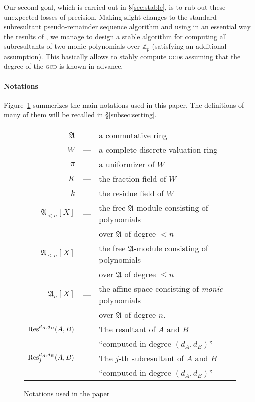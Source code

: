 \documentclass{jT}
\numberwithin{equation}{section}
\theoremstyle{definition}
\newcommand{\Z}{\mathbb Z}
\newcommand{\Zp}{\Z_p}
\newcommand{\ring}{\mathfrak A}
\renewcommand{\Res}{\text{\rm Res}}
\newcommand{\A}{W}
\begin{document}
Our second goal, which is carried out in \S \ref{sec:stable}, is to rub 
out these unexpected losses of precision. Making slight changes to the 
standard subresultant pseudo-remainder sequence algorithm and using in 
an essential way the results of \cite{padicprec}, we manage to design a stable 
algorithm for computing all subresultants of two monic polynomials over 
$\Zp$ (satisfying an additional assumption). This basically allows 
to stably compute \textsc{gcd}s assuming that the degree of the 
\textsc{gcd} is known in advance.

\paragraph{Notations}

Figure~\ref{fig:notations} summerizes the main notations used in
this paper. The definitions of many of them will be recalled in 
\S \ref{subsec:setting}.

\begin{figure}
\begin{center}
\begin{tabular}{rcl}
$\ring$ &--- & a commutative ring \\
$\A$ &---& a complete discrete valuation ring \\
$\pi$ &---& a uniformizer of $\A$ \\
$K$ &---& the fraction field of $\A$ \\
$k$ &---& the residue field of $\A$ \smallskip \\

$\ring_{<n}[X]$ &---& the free $\ring$-module consisting of
polynomials\\ & & over $\ring$ of degree $<n$ \\
$\ring_{\leq n}[X]$ &---& the free $\ring$-module consisting of
polynomials\\ & & over $\ring$ of degree $\leq n$ \\
$\ring_n[X]$ &---& the affine space consisting of \emph{monic}
polynomials\\ & & over $\ring$ of degree $n$. \smallskip \\

$\Res^{d_A,d_B}(A,B)$ &---& The resultant of $A$ and
$B$\\ & & ``computed in degree $(d_A,d_B)$'' \\
$\Res_j^{d_A,d_B}(A,B)$ &---& The $j$-th subresultant of $A$ and
$B$\\ & & ``computed in degree $(d_A,d_B)$'' \\
\end{tabular}
\end{center}

\vspace{-0.2cm}

\caption{Notations used in the paper}
\label{fig:notations}
\end{figure}
\end{document}
